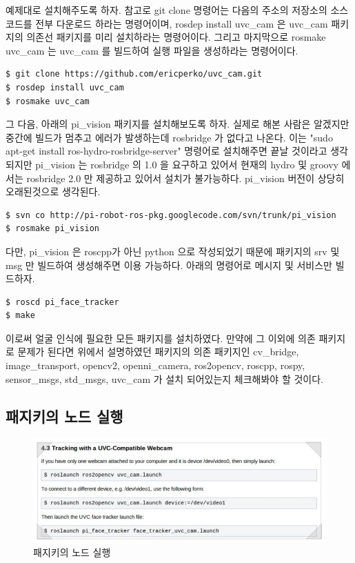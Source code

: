 예제대로 설치해주도록 하자. 참고로 git clone 명령어는 다음의 주소의 저장소의 소스코드를 전부 다운로드 하라는 명령어이며, rosdep install uvc\_cam 은 uvc\_cam 패키지의 의존선 패키지를 미리 설치하라는 명령어이다. 그리고 마지막으로 rosmake uvc\_cam 는 uvc\_cam 를 빌드하여 실행 파일을 생성하라는 명령어이다.

\begin{lstlisting}[language=ROS]
$ git clone https://github.com/ericperko/uvc_cam.git
$ rosdep install uvc_cam
$ rosmake uvc_cam
\end{lstlisting}

그 다음, 아래의 pi\_vision 패키지를 설치해보도록 하자. 실제로 해본 사람은 알겠지만 중간에 빌드가 멈추고 에러가 발생하는데 rosbridge 가 없다고 나온다.  이는 "sudo apt-get install ros-hydro-rosbridge-server" 명령어로 설치해주면 끝날 것이라고 생각되지만 pi\_vision 는 rosbridge 의 1.0 을 요구하고 있어서 현재의 hydro 및 groovy 에서는 rosbridge 2.0 만 제공하고 있어서 설치가 불가능하다. pi\_vision 버전이 상당히 오래된것으로 생각된다.

\begin{lstlisting}[language=ROS]
$ svn co http://pi-robot-ros-pkg.googlecode.com/svn/trunk/pi_vision
$ rosmake pi_vision
\end{lstlisting}

다만, pi\_vision 은 roscpp가 아닌 python 으로 작성되었기 때문에 패키지의 srv 및 msg 만 빌드하여 생성해주면 이용 가능하다.  아래의 명령어로 메시지 및 서비스만 빌드하자.

\begin{lstlisting}[language=ROS]
$ roscd pi_face_tracker
$ make
\end{lstlisting}

이로써 얼굴 인식에 필요한 모든 패키지를 설치하였다. 만약에 그 이외에 의존 패키지로 문제가 된다면 위에서 설명하였던 패키지의 의존 패키지인 cv\_bridge, image\_transport, opencv2, openni\_camera, ros2opencv, roscpp, rospy, sensor\_msgs, std\_msgs, uvc\_cam 가 설치 되어있는지 체크해봐야 할 것이다.

\subsection{패지키의 노드 실행}

\begin{figure}[h]
\centering\includegraphics[width=0.9\columnwidth]{pictures/chapter8/openpkg5.jpg}
\caption{패지키의 노드 실행}
\end{figure}

